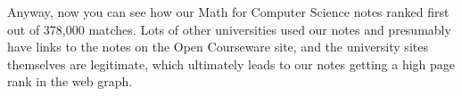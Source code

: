 Anyway, now you can see how our Math for Computer Science notes ranked
first out of 378,000 matches.  Lots of other universities used our
notes and presumably have links to the notes on the Open Courseware
site, and the university sites themselves are legitimate, which
ultimately leads to our notes getting a high page rank in the web
graph.

\begin{problems}

\classproblems
{}

\homeworkproblems
{}

\examproblems
{}

\end{problems}



\endinput
